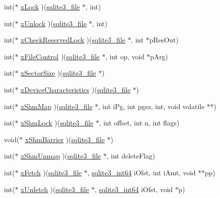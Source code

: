 \begin{DoxyCompactItemize}
\item 
int($\ast$ \mbox{\hyperlink{structsqlite3__io__methods_ac88793475b0c4188fb02c229f1a11e8b}{x\+Lock}} )(\mbox{\hyperlink{structsqlite3__file}{sqlite3\+\_\+file}} $\ast$, int)
\item 
int($\ast$ \mbox{\hyperlink{structsqlite3__io__methods_a5ce75a5ca2df9c1edcaef74d4c0d7e38}{x\+Unlock}} )(\mbox{\hyperlink{structsqlite3__file}{sqlite3\+\_\+file}} $\ast$, int)
\item 
int($\ast$ \mbox{\hyperlink{structsqlite3__io__methods_a484752731e4a054c97497ad8d48a344b}{x\+Check\+Reserved\+Lock}} )(\mbox{\hyperlink{structsqlite3__file}{sqlite3\+\_\+file}} $\ast$, int $\ast$p\+Res\+Out)
\item 
int($\ast$ \mbox{\hyperlink{structsqlite3__io__methods_a913b12deb1dcae2c61b90776bcd9d19c}{x\+File\+Control}} )(\mbox{\hyperlink{structsqlite3__file}{sqlite3\+\_\+file}} $\ast$, int op, void $\ast$p\+Arg)
\item 
int($\ast$ \mbox{\hyperlink{structsqlite3__io__methods_a7a1c0cf3c4de6402a69f50e625be5ca2}{x\+Sector\+Size}} )(\mbox{\hyperlink{structsqlite3__file}{sqlite3\+\_\+file}} $\ast$)
\item 
int($\ast$ \mbox{\hyperlink{structsqlite3__io__methods_abbf1b4769c310bfee517af815eed93e9}{x\+Device\+Characteristics}} )(\mbox{\hyperlink{structsqlite3__file}{sqlite3\+\_\+file}} $\ast$)
\item 
int($\ast$ \mbox{\hyperlink{structsqlite3__io__methods_a2222efe012f210417f9881103014cdc5}{x\+Shm\+Map}} )(\mbox{\hyperlink{structsqlite3__file}{sqlite3\+\_\+file}} $\ast$, int i\+Pg, int pgsz, int, void volatile $\ast$$\ast$)
\item 
int($\ast$ \mbox{\hyperlink{structsqlite3__io__methods_a2dbd4777e8ebce36b91dd5d64aef9bbf}{x\+Shm\+Lock}} )(\mbox{\hyperlink{structsqlite3__file}{sqlite3\+\_\+file}} $\ast$, int offset, int n, int flags)
\item 
void($\ast$ \mbox{\hyperlink{structsqlite3__io__methods_aa4e436fef318c4702940da870f8e2710}{x\+Shm\+Barrier}} )(\mbox{\hyperlink{structsqlite3__file}{sqlite3\+\_\+file}} $\ast$)
\item 
int($\ast$ \mbox{\hyperlink{structsqlite3__io__methods_a494ae8bbfe91c38598c73aaa18f1848f}{x\+Shm\+Unmap}} )(\mbox{\hyperlink{structsqlite3__file}{sqlite3\+\_\+file}} $\ast$, int delete\+Flag)
\item 
int($\ast$ \mbox{\hyperlink{structsqlite3__io__methods_a71e611fc755d95ffbd3e7ecb8cb5fae6}{x\+Fetch}} )(\mbox{\hyperlink{structsqlite3__file}{sqlite3\+\_\+file}} $\ast$, \mbox{\hyperlink{sqlite3_8h_a0a4d3e6c1ad46f90e746b920ab6ca0d2}{sqlite3\+\_\+int64}} i\+Ofst, int i\+Amt, void $\ast$$\ast$pp)
\item 
int($\ast$ \mbox{\hyperlink{structsqlite3__io__methods_abebf1bbaa50bea56f0e37d0f66193bda}{x\+Unfetch}} )(\mbox{\hyperlink{structsqlite3__file}{sqlite3\+\_\+file}} $\ast$, \mbox{\hyperlink{sqlite3_8h_a0a4d3e6c1ad46f90e746b920ab6ca0d2}{sqlite3\+\_\+int64}} i\+Ofst, void $\ast$p)
\end{DoxyCompactItemize}



